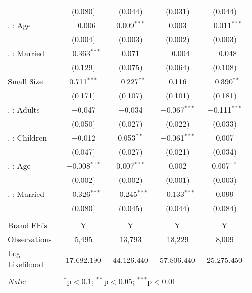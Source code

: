 \begin{table}[!htbp]
\begin{tabular}{@{\extracolsep{5pt}}lcccc}
  & (0.080) & (0.044) & (0.031) & (0.044) \\ 
  . : Age & $-$0.006 & 0.009$^{***}$ & 0.003 & $-$0.011$^{***}$ \\ 
  & (0.004) & (0.003) & (0.002) & (0.003) \\ 
  . : Married & $-$0.363$^{***}$ & 0.071 & $-$0.004 & $-$0.048 \\ 
  & (0.129) & (0.075) & (0.064) & (0.108) \\ 
  Small Size & 0.711$^{***}$ & $-$0.227$^{**}$ & 0.116 & $-$0.390$^{**}$ \\ 
  & (0.171) & (0.107) & (0.101) & (0.181) \\ 
  . : Adults & $-$0.047 & $-$0.034 & $-$0.067$^{***}$ & $-$0.111$^{***}$ \\ 
  & (0.050) & (0.027) & (0.022) & (0.033) \\ 
  . : Children & $-$0.012 & 0.053$^{**}$ & $-$0.061$^{***}$ & 0.007 \\ 
  & (0.047) & (0.027) & (0.021) & (0.034) \\ 
  . : Age & $-$0.008$^{***}$ & 0.007$^{***}$ & 0.002 & 0.007$^{**}$ \\ 
  & (0.002) & (0.002) & (0.001) & (0.003) \\ 
  . : Married & $-$0.326$^{***}$ & $-$0.245$^{***}$ & $-$0.133$^{***}$ & 0.099 \\ 
  & (0.080) & (0.045) & (0.044) & (0.084) \\ 
 \hline \\[-1.8ex] 
Brand FE's & Y & Y & Y & Y \\ 
Observations & 5,495 & 13,793 & 18,229 & 8,009 \\ 
Log Likelihood & $-$17,682.190 & $-$44,126.440 & $-$57,806.440 & $-$25,275.450 \\ 
\hline 
\hline \\[-1.8ex] 
\textit{Note:}  & \multicolumn{4}{l}{$^{*}$p$<$0.1; $^{**}$p$<$0.05; $^{***}$p$<$0.01} \\ 
\end{tabular} 
\end{table} 
